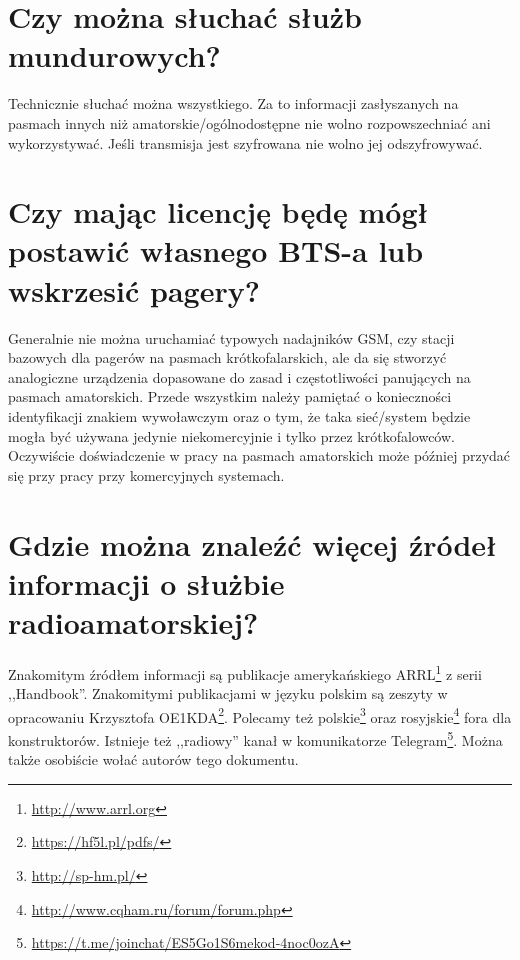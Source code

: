 \documentclass[a4paper,12pt]{article}
\begin{document}
\section{Czy można słuchać służb mundurowych?}
Technicznie słuchać można wszystkiego. Za to informacji zasłyszanych na pasmach innych niż amatorskie/ogólnodostępne nie wolno rozpowszechniać ani wykorzystywać. Jeśli transmisja jest szyfrowana nie wolno jej odszyfrowywać.

\section{Czy mając licencję będę mógł postawić własnego BTS-a lub wskrzesić pagery?}
Generalnie nie można uruchamiać typowych nadajników GSM, czy stacji bazowych dla pagerów na pasmach krótkofalarskich, ale da się stworzyć analogiczne urządzenia dopasowane do zasad i częstotliwości panujących na pasmach amatorskich. Przede wszystkim należy pamiętać o konieczności identyfikacji znakiem wywoławczym oraz o tym, że taka sieć/system będzie mogła być używana jedynie niekomercyjnie i tylko przez krótkofalowców. Oczywiście doświadczenie w pracy na pasmach amatorskich może później przydać się przy pracy przy komercyjnych systemach. 

\section{Gdzie można znaleźć więcej źródeł informacji o służbie radioamatorskiej?}
Znakomitym źródłem informacji są publikacje amerykańskiego ARRL\footnote{\url{http://www.arrl.org}} z serii ,,Handbook''. Znakomitymi publikacjami w języku polskim są zeszyty w opracowaniu Krzysztofa OE1KDA\footnote{\url{https://hf5l.pl/pdfs/}}. Polecamy też polskie\footnote{\url{http://sp-hm.pl/}} oraz rosyjskie\footnote{\url{http://www.cqham.ru/forum/forum.php}} fora dla konstruktorów. Istnieje też ,,radiowy'' kanał w komunikatorze Telegram\footnote{\url{https://t.me/joinchat/ES5Go1S6mekod-4noc0ozA}}. Można także osobiście wołać autorów tego dokumentu.
\end{document}
